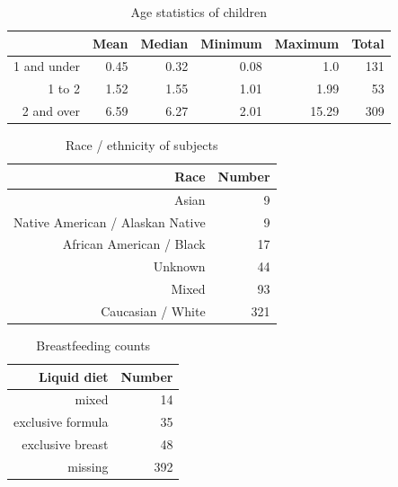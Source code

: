\documentclass[fleqn,10pt]{wlscirep}
\begin{document}
\begin{table}[ht]
\centering
\begin{tabular}{rrrrrr}
    \hline\hline
    \textbf{ } & \textbf{Mean} & \textbf{Median} & \textbf{Minimum} & \textbf{Maximum} & \textbf{Total} \\\hline
    1 and under & 0.45 & 0.32 & 0.08 & 1.0 & 131 \\
    1 to 2 & 1.52 & 1.55 & 1.01 & 1.99 & 53 \\
    2 and over & 6.59 & 6.27 & 2.01 & 15.29 & 309 \\\hline\hline
  \end{tabular}
\caption{
    Age statistics of children
}
\label{tab:agestats}
\end{table}

\begin{table}[ht]
\centering
\begin{tabular}{rr}
    \hline\hline
    \textbf{Race} & \textbf{Number} \\\hline
    Asian  & 9 \\
    Native American / Alaskan Native & 9 \\
    African American / Black & 17 \\
    Unknown & 44 \\
    Mixed & 93 \\
    Caucasian / White & 321 \\\hline\hline
\end{tabular}
\caption{
    Race / ethnicity of subjects
}
\label{tab:race}
\end{table}

\begin{table}[ht]
\centering
\begin{tabular}{rr}
    \hline\hline
    \textbf{Liquid diet} & \textbf{Number} \\\hline
    mixed & 14 \\
    exclusive formula & 35 \\
    exclusive breast & 48 \\
    missing & 392 \\\hline\hline
\end{tabular}
\caption{
    Breastfeeding counts
}
\label{tab:breastfeeding}
\end{table}
\end{document}
